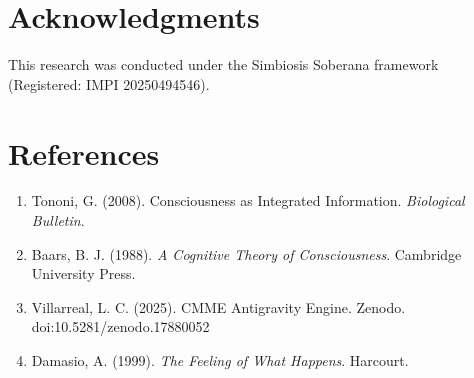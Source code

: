 \documentclass[a4paper,11pt,twocolumn]{article}
\begin{document}
\section*{Acknowledgments}
This research was conducted under the Simbiosis Soberana framework (Registered: IMPI 20250494546).

\section*{References}
\begin{enumerate}
    \item Tononi, G. (2008). Consciousness as Integrated Information. \textit{Biological Bulletin}.
    \item Baars, B. J. (1988). \textit{A Cognitive Theory of Consciousness}. Cambridge University Press.
    \item Villarreal, L. C. (2025). CMME Antigravity Engine. Zenodo. doi:10.5281/zenodo.17880052
    \item Damasio, A. (1999). \textit{The Feeling of What Happens}. Harcourt.
\end{enumerate}
\end{document}
